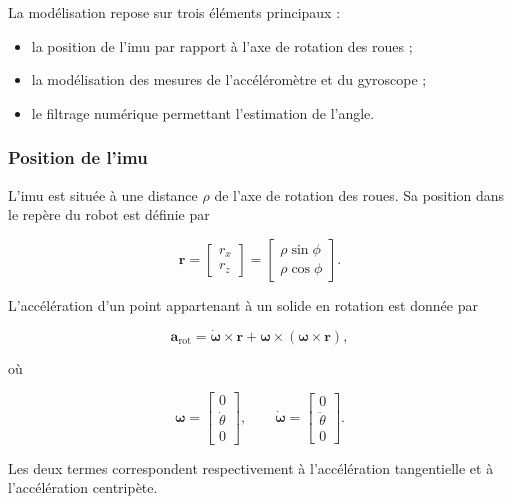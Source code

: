 La modélisation repose sur trois éléments principaux :
\begin{itemize}
\item la position de l'\acrshort{imu} par rapport à l'axe de rotation des roues ;
\item la modélisation des mesures de l'accéléromètre et du gyroscope ;
\item le filtrage numérique permettant l'estimation de l'angle.
\end{itemize}

\subsubsection{Position de l'\acrshort{imu}}
\label{subsubsection:position_imu}

L'\acrshort{imu} est située à une distance $\rho$ de l'axe de rotation des roues. Sa position dans le repère du robot est définie par

\begin{equation}
\mathbf{r}=
\begin{bmatrix}
r_x\\
r_z
\end{bmatrix}
=
\begin{bmatrix}
\rho\sin\phi\\
\rho\cos\phi
\end{bmatrix}.
\end{equation}

L'accélération d'un point appartenant à un solide en rotation est donnée par

\begin{equation}
\mathbf{a}_{\mathrm{rot}}
=
\dot{\boldsymbol{\omega}}\times\mathbf{r}
+
\boldsymbol{\omega}\times
(\boldsymbol{\omega}\times\mathbf{r}),
\end{equation}

où

\begin{equation}
\boldsymbol{\omega}
=
\begin{bmatrix}
0\\
\dot{\theta}\\
0
\end{bmatrix},
\qquad
\dot{\boldsymbol{\omega}}
=
\begin{bmatrix}
0\\
\ddot{\theta}\\
0
\end{bmatrix}.
\end{equation}

Les deux termes correspondent respectivement à l'accélération tangentielle et à l'accélération centripète.

